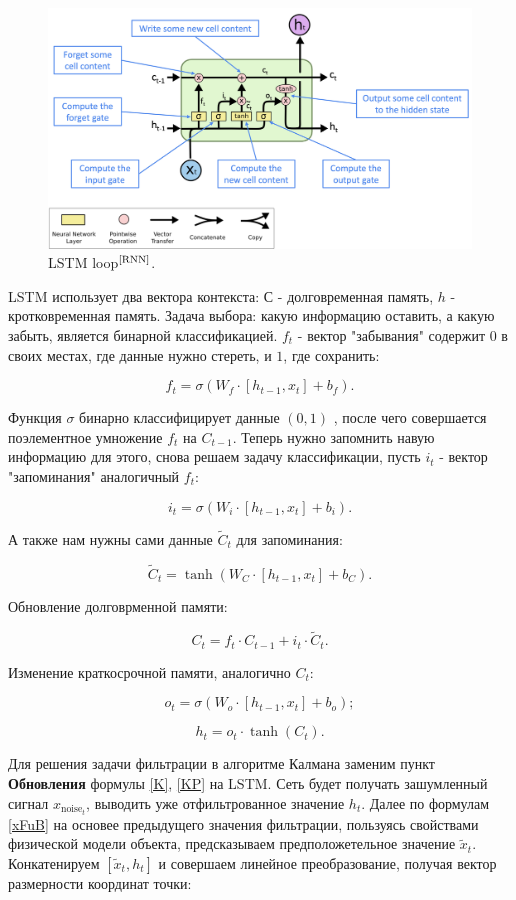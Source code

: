 \documentclass[a4paper,11pt]{article} %
\begin{document}
\begin{figure}[h!]
\begin{center}
\includegraphics[width=1\textwidth]{images/RNN4}
\end{center}
\caption{LSTM loop$^\text{\cite{RNN}}$.} \label{RNN4}
\end{figure}

LSTM использует два вектора контекста: $С$  - долговременная память, $h$ - кротковременная память.  Задача выбора: какую информацию оставить, а какую забыть,  является бинарной классификацией. $f_t$ - вектор "забывания" содержит $0$ в своих местах,  где  данные нужно стереть,  и  $1$,   где сохранить:

$$f_t=\sigma(W_f\cdot[h_{t-1},x_t]+b_f).$$

Функция  $\sigma$ бинарно классифицирует данные $(0,1)$ , после чего совершается поэлементное умножение $f_t$ на  $C_{t-1}$. Теперь нужно запомнить навую информацию для этого, снова решаем задачу классификации, пусть $i_t$ - вектор "запоминания" аналогичный $f_t$:

$$i_t=\sigma(W_i\cdot[h_{t-1},x_t]+b_i).$$

А также нам нужны сами данные $\widetilde{C}_t$ для запоминания:

$$\widetilde{C}_t = \tanh(W_C\cdot[h_{t-1},x_t]+b_C).$$

Обновление долговрменной памяти:

$$C_t=f_t\cdot C_{t-1}+i_t\cdot \widetilde{C}_t.$$

Изменение  краткосрочной памяти,  аналогично $C_t$:

$$o_t=\sigma(W_o\cdot[h_{t-1},x_t]+b_o);$$

$$h_t=o_t\cdot\tanh(C_t).$$
 
 Для решения задачи фильтрации в алгоритме Калмана заменим пункт \textbf{Обновления}  формулы \ref{K}, \ref{KP} на LSTM.  Сеть  будет получать зашумленный сигнал $x_{\text{noise}_t}$, выводить уже отфильтрованное значение $h_t$. Далее по формулам \ref{xFuB} на основее предыдущего значения фильтрации,  пользуясь свойствами физической модели объекта, предсказываем предположетельное значение $\widetilde{x}_t$.  Конкатенируем $[\widetilde{x}_t,h_t]$ и совершаем линейное преобразование,  получая вектор  размерности  координат точки:
 
\end{document}

